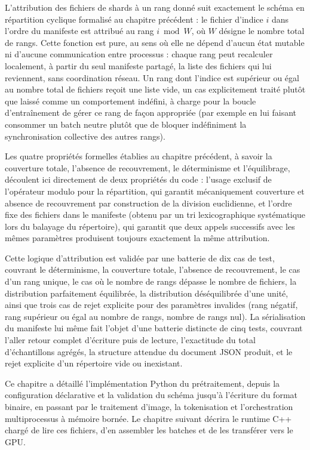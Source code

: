\documentclass[12pt,a4paper]{report}
\begin{document}
L'attribution des fichiers de shards à un rang donné suit exactement le schéma en répartition cyclique formalisé au chapitre précédent : le fichier d'indice $i$ dans l'ordre du manifeste est attribué au rang $i \bmod W$, où $W$ désigne le nombre total de rangs. Cette fonction est pure, au sens où elle ne dépend d'aucun état mutable ni d'aucune communication entre processus : chaque rang peut recalculer localement, à partir du seul manifeste partagé, la liste des fichiers qui lui reviennent, sans coordination réseau. Un rang dont l'indice est supérieur ou égal au nombre total de fichiers reçoit une liste vide, un cas explicitement traité plutôt que laissé comme un comportement indéfini, à charge pour la boucle d'entraînement de gérer ce rang de façon appropriée (par exemple en lui faisant consommer un batch neutre plutôt que de bloquer indéfiniment la synchronisation collective des autres rangs).

Les quatre propriétés formelles établies au chapitre précédent, à savoir la couverture totale, l'absence de recouvrement, le déterminisme et l'équilibrage, découlent ici directement de deux propriétés du code : l'usage exclusif de l'opérateur modulo pour la répartition, qui garantit mécaniquement couverture et absence de recouvrement par construction de la division euclidienne, et l'ordre fixe des fichiers dans le manifeste (obtenu par un tri lexicographique systématique lors du balayage du répertoire), qui garantit que deux appels successifs avec les mêmes paramètres produisent toujours exactement la même attribution.

Cette logique d'attribution est validée par une batterie de dix cas de test, couvrant le déterminisme, la couverture totale, l'absence de recouvrement, le cas d'un rang unique, le cas où le nombre de rangs dépasse le nombre de fichiers, la distribution parfaitement équilibrée, la distribution déséquilibrée d'une unité, ainsi que trois cas de rejet explicite pour des paramètres invalides (rang négatif, rang supérieur ou égal au nombre de rangs, nombre de rangs nul). La sérialisation du manifeste lui même fait l'objet d'une batterie distincte de cinq tests, couvrant l'aller retour complet d'écriture puis de lecture, l'exactitude du total d'échantillons agrégés, la structure attendue du document JSON produit, et le rejet explicite d'un répertoire vide ou inexistant.

\bigskip
\noindent Ce chapitre a détaillé l'implémentation Python du prétraitement, depuis la configuration déclarative et la validation du schéma jusqu'à l'écriture du format binaire, en passant par le traitement d'image, la tokenisation et l'orchestration multiprocessus à mémoire bornée. Le chapitre suivant décrira le runtime C++ chargé de lire ces fichiers, d'en assembler les batches et de les transférer vers le GPU.
\end{document}
